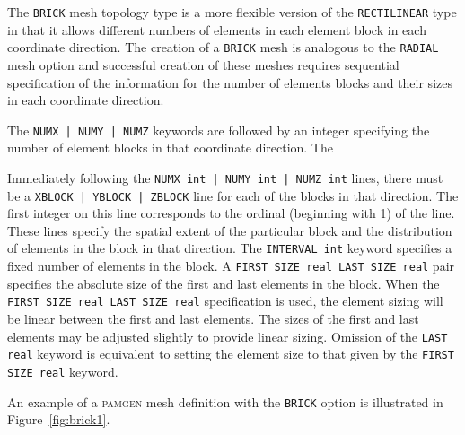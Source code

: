 The \texttt{BRICK} mesh topology type is a more flexible version of the \texttt{RECTILINEAR} type in that it allows different numbers of elements in each element block in each coordinate direction. The creation of a
\texttt{BRICK} mesh is analogous to the \texttt{RADIAL} mesh option
and
successful creation of these meshes requires sequential
specification of the information for the number of elements blocks and
their sizes in each coordinate direction. 

The \texttt{NUMX | NUMY | NUMZ} keywords are followed by an integer
specifying the number
of element blocks in that coordinate direction. The

Immediately following
the \texttt{NUMX int | NUMY int | NUMZ int} lines, there must be a \texttt{XBLOCK |
  YBLOCK | ZBLOCK} line for each of the blocks in that direction. The first integer on  this line corresponds to the ordinal (beginning with 1) of the line.
These lines specify the spatial extent of the particular block and the
distribution of elements in the block in that direction. The \texttt{INTERVAL int} keyword
specifies a fixed number of elements in the
block. A \texttt{FIRST SIZE real LAST SIZE real} pair specifies the absolute
size of the first and last elements in the block. When the \texttt{FIRST SIZE real LAST SIZE real} specification is
used, the element sizing will be linear between the first and last
elements. The sizes of the first and last elements may be
adjusted slightly to provide linear sizing. Omission of the
\texttt{LAST real} keyword is equivalent to setting the element size
to that given by the \texttt{FIRST SIZE real} keyword.


An example of a \textsc{pamgen} mesh definition with the
\texttt{BRICK} option is illustrated in
Figure~\ref{fig:brick1}.

